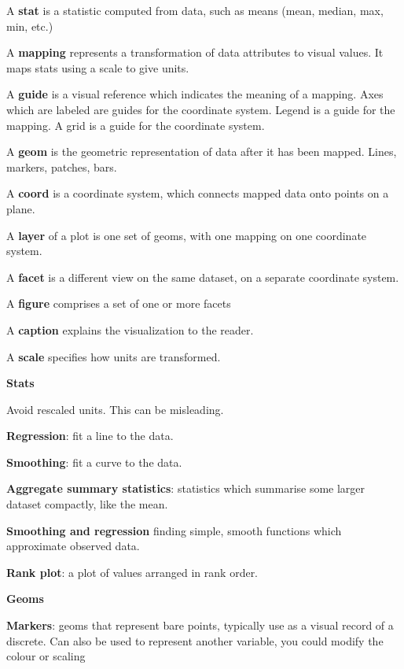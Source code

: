 \documentclass{article}
\begin{document}
A \textbf{stat} is a statistic computed from data, such as means (mean, median, max, min,  etc.)

A \textbf{mapping} represents a transformation of data attributes to visual values. It maps stats using a scale to give units.

A \textbf{guide} is a visual reference which indicates the meaning of a mapping. Axes which are labeled are guides for the coordinate system.
Legend is a guide for the mapping. A grid is a guide for the coordinate system.

A \textbf{geom} is the geometric representation of data after it has been mapped. Lines, markers, patches, bars.

A \textbf{coord} is a coordinate system, which connects mapped data onto points on a plane.

A \textbf{layer} of a plot is one set of geoms, with one mapping on one coordinate system.

A \textbf{facet} is a different view on the same dataset, on a separate coordinate system.

A \textbf{figure} comprises a set of one or more facets

A \textbf{caption} explains the visualization to the reader.

A \textbf{scale} specifies how units are transformed.

\vspace{\baselineskip}

\textbf{Stats}

Avoid rescaled units. This can be misleading.

\textbf{Regression}: fit a line to the data.

\textbf{Smoothing}: fit a curve to the data.

\textbf{Aggregate summary statistics}: statistics which summarise some larger dataset compactly, like the mean.

\textbf{Smoothing and regression} finding simple, smooth functions which approximate observed data.

\textbf{Rank plot}: a plot of values arranged in rank order.

\vspace{\baselineskip}

\textbf{Geoms}

\textbf{Markers}: geoms that represent bare points, typically use as a visual record of a discrete. Can also be used to represent another variable, you
could modify the colour or scaling
\end{document}
